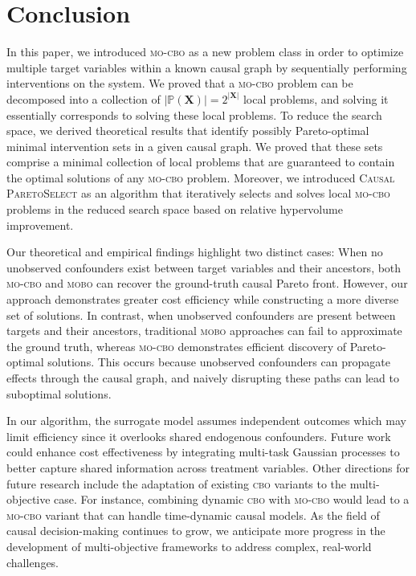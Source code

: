 \section{Conclusion}
In this paper, we introduced \textsc{mo-cbo} as a new problem class in order to optimize multiple target variables within a known causal graph by sequentially performing interventions on the system. We proved that a \textsc{mo-cbo} problem can be decomposed into a collection of $|\mathbb{P}(\mathbf{X})| = 2^{|\mathbf{X}|}$ local problems, and solving it essentially corresponds to solving these local problems. To reduce the search space, we derived theoretical results that identify possibly Pareto-optimal minimal intervention sets in a given causal graph. We proved that these sets comprise a minimal collection of local problems that are guaranteed to contain the optimal solutions of any \textsc{mo-cbo} problem. Moreover, we introduced \textsc{Causal ParetoSelect} as an algorithm that iteratively selects and solves local \textsc{mo-cbo} problems in the reduced search space based on relative hypervolume improvement.

Our theoretical and empirical findings highlight two distinct cases: When no unobserved confounders exist between target variables and their ancestors, both \textsc{mo-cbo} and \textsc{mobo} can recover the ground-truth causal Pareto front. However, our approach demonstrates greater cost efficiency while constructing a more diverse set of solutions. In contrast, when unobserved confounders are present between targets and their ancestors, traditional \textsc{mobo} approaches can fail to approximate the ground truth, whereas \textsc{mo-cbo} demonstrates efficient discovery of Pareto-optimal solutions. This occurs because unobserved confounders can propagate effects through the causal graph, and naively disrupting these paths can lead to suboptimal solutions.

In our algorithm, the surrogate model assumes independent outcomes which may limit efficiency since it overlooks shared endogenous confounders. Future work could enhance cost effectiveness by integrating multi-task Gaussian processes to better capture shared information across treatment variables. Other directions for future research include the adaptation of existing \textsc{cbo} variants to the multi-objective case. For instance, combining dynamic \textsc{cbo} \citep{NEURIPS2021_577bcc91} with \textsc{mo-cbo} would lead to a \textsc{mo-cbo} variant that can handle time-dynamic causal models. As the field of causal decision-making continues to grow, we anticipate more progress in the development of multi-objective frameworks to address complex, real-world challenges.